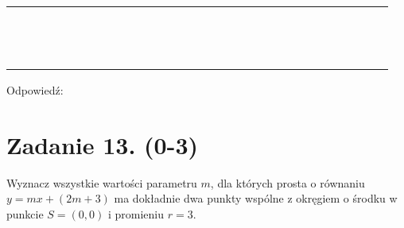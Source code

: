 \documentclass[10pt]{article}
\begin{document}
\begin{center}
\begin{tabular}{|c|c|c|c|c|c|c|c|c|c|c|c|c|c|c|c|c|c|c|c|c|c|c|c|c|c|c|c|c|c|}
\hline
 &  &  &  &  &  &  &  &  &  &  &  &  &  &  &  &  &  &  &  &  &  &  &  &  &  &  &  &  &  \\
\hline
 &  &  &  &  &  &  &  &  &  &  &  &  &  &  &  &  &  &  &  &  &  &  &  &  &  &  &  &  &  \\
\hline
 &  &  &  &  &  &  &  &  &  &  &  &  &  &  &  &  &  &  &  &  &  &  &  &  &  &  &  &  &  \\
\hline
 &  &  &  &  &  &  &  &  &  &  &  &  &  &  &  &  &  &  &  &  &  &  &  &  &  &  &  &  &  \\
\hline
 &  &  &  &  &  &  &  &  &  &  &  &  &  &  &  &  &  &  &  &  &  &  &  &  &  &  &  &  &  \\
\hline
 &  &  &  &  &  &  &  &  &  &  &  &  &  &  &  &  &  &  &  &  &  &  &  &  &  &  &  &  &  \\
\hline
 &  &  &  &  &  &  &  &  &  &  &  &  &  &  &  &  &  &  &  &  &  &  &  &  &  &  &  &  &  \\
\hline
 &  &  &  &  &  &  &  &  &  &  &  &  &  &  &  &  &  &  &  &  &  &  &  &  &  &  &  &  &  \\
\hline
 &  &  &  &  &  &  &  &  &  &  &  &  &  &  &  &  &  &  &  &  &  &  &  &  &  &  &  &  &  \\
\hline
 &  &  &  &  &  &  &  &  &  &  &  &  &  &  &  &  &  &  &  &  &  &  &  &  &  &  &  &  &  \\
\hline
 &  &  &  &  &  &  &  &  &  &  &  &  &  &  &  &  &  &  &  &  &  &  &  &  &  &  &  &  &  \\
\hline
 &  &  &  &  &  &  &  &  &  &  &  &  &  &  &  &  &  &  &  &  &  &  &  &  &  &  &  &  &  \\
\hline
 &  &  &  &  &  &  &  &  &  &  &  &  &  &  &  &  &  &  &  &  &  &  &  &  &  &  &  &  &  \\
\hline
 &  &  &  &  &  &  &  &  &  &  &  &  &  &  &  &  &  &  &  &  &  &  &  &  &  &  &  &  &  \\
\hline
\end{tabular}
\end{center}

Odpowiedź: \(\qquad\)

\section*{Zadanie 13. (0-3)}
Wyznacz wszystkie wartości parametru \(m\), dla których prosta o równaniu \(y=m x+(2 m+3)\) ma dokładnie dwa punkty wspólne z okręgiem o środku w punkcie \(S=(0,0)\) i promieniu \(r=3\).
\end{document}

